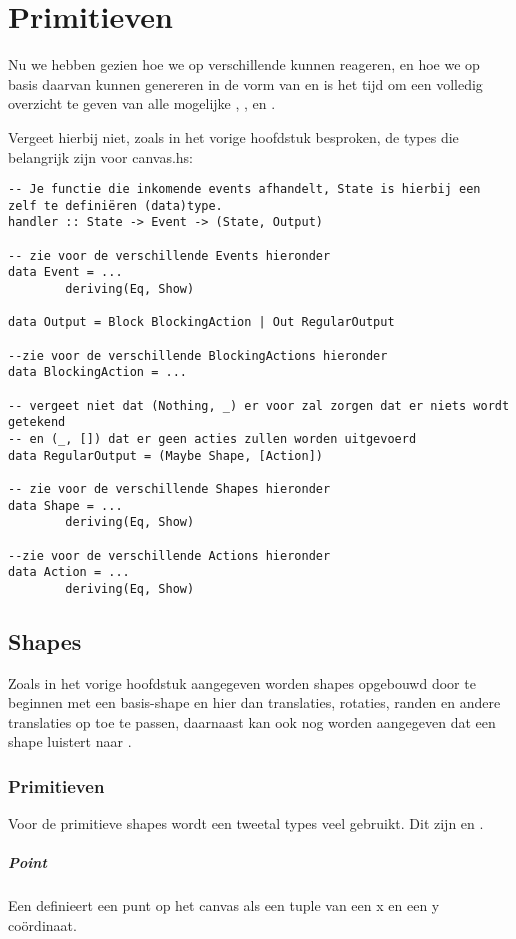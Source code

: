 \section{Primitieven}
Nu we hebben gezien hoe we op verschillende \events kunnen reageren, en hoe we op basis daarvan  kunnen genereren in de vorm van \shapes en \actions is het tijd om een volledig overzicht te geven van alle mogelijke \events , \shapes , en \actions.

Vergeet hierbij niet, zoals in het vorige hoofdstuk besproken, de types die belangrijk zijn voor canvas.hs:

\begin{lstlisting}
-- Je functie die inkomende events afhandelt, State is hierbij een zelf te definiëren (data)type.
handler :: State -> Event -> (State, Output)

-- zie voor de verschillende Events hieronder
data Event = ...
		deriving(Eq, Show)

data Output = Block BlockingAction | Out RegularOutput

--zie voor de verschillende BlockingActions hieronder
data BlockingAction = ... 

-- vergeet niet dat (Nothing, _) er voor zal zorgen dat er niets wordt getekend 
-- en (_, []) dat er geen acties zullen worden uitgevoerd
data RegularOutput = (Maybe Shape, [Action])

-- zie voor de verschillende Shapes hieronder
data Shape = ...
		deriving(Eq, Show)

--zie voor de verschillende Actions hieronder
data Action = ...
		deriving(Eq, Show)
\end{lstlisting}

\subsection{Shapes}
Zoals in het vorige hoofdstuk aangegeven worden shapes opgebouwd door te beginnen met een basis-shape en hier dan translaties, rotaties, randen en andere translaties op toe te passen, daarnaast kan ook nog worden aangegeven dat een shape luistert naar \events.

\subsubsection{Primitieven}
Voor de primitieve shapes wordt een tweetal types veel gebruikt. Dit zijn  en . 

\subparagraph{Point}
Een  definieert een punt op het canvas als een tuple van een x en een y coördinaat. 

